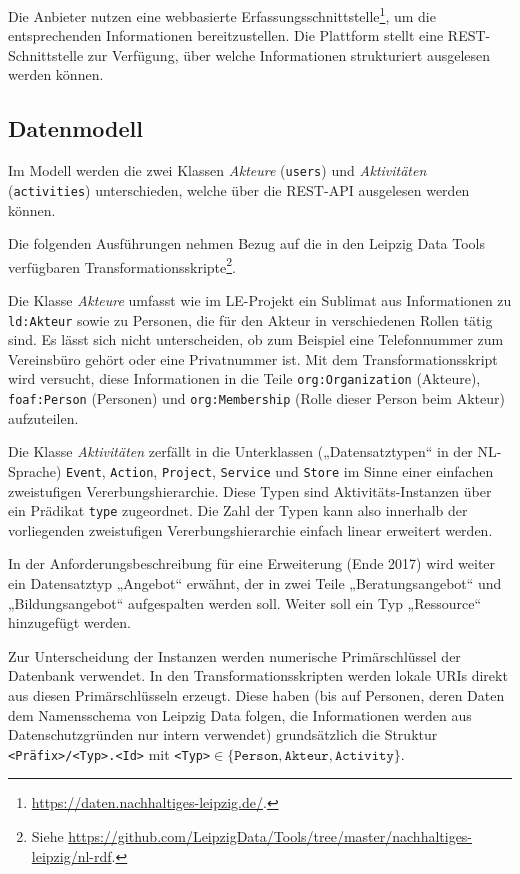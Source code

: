 \documentclass[a4paper,11pt]{article}
\begin{document}
Die Anbieter nutzen eine webbasierte
Erfassungsschnittstelle\footnote{\url{https://daten.nachhaltiges-leipzig.de/}.},
um die entsprechenden Informationen bereitzustellen.  Die Plattform stellt
eine REST-Schnittstelle zur Verfügung, über welche Informationen strukturiert
ausgelesen werden können.

\subsection{Datenmodell}

Im Modell werden die zwei Klassen \emph{Akteure} (\texttt{users}) und
\emph{Aktivitäten} (\texttt{activities}) unterschieden, welche über die
REST-API ausgelesen werden können.

Die folgenden Ausführungen nehmen Bezug auf die in den Leipzig
Data Tools verfügbaren Transformationsskripte\footnote{Siehe
  \url{https://github.com/LeipzigData/Tools/tree/master/nachhaltiges-leipzig/nl-rdf}.}.

Die Klasse \emph{Akteure} umfasst wie im LE-Projekt ein Sublimat aus
Informationen zu \texttt{ld:Akteur} sowie zu Personen, die für den Akteur in
verschiedenen Rollen tätig sind.  Es lässt sich nicht unterscheiden, ob zum
Beispiel eine Telefonnummer zum Vereinsbüro gehört oder eine Privatnummer ist.
Mit dem Transformationsskript wird versucht, diese Informationen in die Teile
\texttt{org:Organization} (Akteure), \texttt{foaf:Person} (Personen) und
\texttt{org:Membership} (Rolle dieser Person beim Akteur) aufzuteilen. 

Die Klasse \emph{Aktivitäten} zerfällt in die Unterklassen („Datensatztypen“ in
der NL-Sprache) \texttt{Event}, \texttt{Action}, \texttt{Project},
\texttt{Service} und \texttt{Store} im Sinne einer einfachen zweistufigen
Vererbungshierarchie.  Diese Typen sind Aktivitäts-Instanzen über ein Prädikat
\texttt{type} zugeordnet. Die Zahl der Typen kann also innerhalb der
vorliegenden zweistufigen Vererbungshierarchie einfach linear erweitert werden.

In der Anforderungsbeschreibung für eine Erweiterung (Ende 2017) wird weiter
ein Datensatztyp „Angebot“ erwähnt, der in zwei Teile „Beratungsangebot“ und
„Bildungsangebot“ aufgespalten werden soll. Weiter soll ein Typ „Ressource“
hinzugefügt werden. 

Zur Unterscheidung der Instanzen werden numerische Primärschlüssel der
Datenbank verwendet. In den Transformationsskripten werden lokale URIs direkt
aus diesen Primärschlüsseln erzeugt. Diese haben (bis auf Personen, deren
Daten dem Namensschema von Leipzig Data folgen, die Informationen werden aus
Datenschutzgründen nur intern verwendet) grundsätzlich die Struktur
\texttt{<Präfix>/<Typ>.<Id>} mit \texttt{<Typ>}$\in \{\texttt{Person},
\texttt{Akteur}, \texttt{Activity}\}$.
\end{document}
